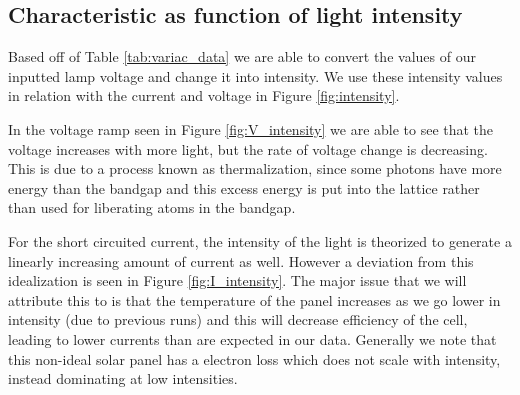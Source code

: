 \subsection{Characteristic as function of light intensity}

Based off of Table \ref{tab:variac_data} we are able to convert the values of our inputted lamp voltage and change it into intensity. We use these intensity values in relation with the current and voltage in Figure \ref{fig:intensity}.

In the voltage ramp seen in Figure \ref{fig:V_intensity} we are able to see that the voltage increases with more light, but the rate of voltage change is decreasing. This is due to a process known as thermalization, since some photons have more energy than the bandgap and this excess energy is put into the lattice rather than used for liberating atoms in the bandgap.

For the short circuited current, the intensity of the light is theorized to generate a linearly increasing amount of current as well. However a deviation from this idealization is seen in Figure \ref{fig:I_intensity}. The major issue that we will attribute this to is that the temperature of the panel increases as we go lower in intensity (due to previous runs) and this will decrease efficiency of the cell, leading to lower currents than are expected in our data. Generally we note that this non-ideal solar panel has a electron loss which does not scale with intensity, instead dominating at low intensities.

